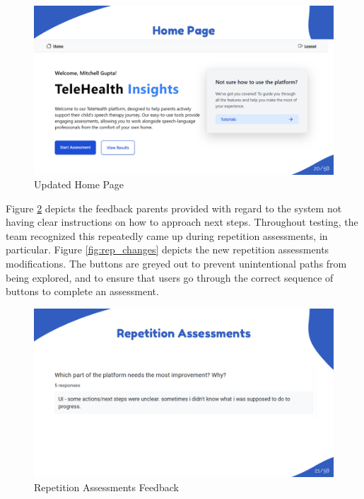 \documentclass{article}
\begin{document}
\begin{figure}[H]
  \centering
  \includegraphics[width=\textwidth]{images/slide20.png}
  \caption{Updated Home Page}
  \label{fig:home_new}
\end{figure}

\newpage

Figure \ref{fig:rep_feedback_parents} depicts the feedback parents provided with regard to the system not having clear instructions on how to approach next steps. Throughout testing, the team recognized this repeatedly came up during repetition assessments, in particular.
Figure \ref{fig:rep_changes} depicts the new repetition assessments modifications. The buttons are greyed out to prevent unintentional paths from being explored, and to ensure that users
go through the correct sequence of buttons to complete an assessment.

\begin{figure}[H]
  \centering
  \includegraphics[width=\textwidth]{images/slide21.png}
  \caption{Repetition Assessments Feedback}
  \label{fig:rep_feedback_parents}
\end{figure}
\end{document}
